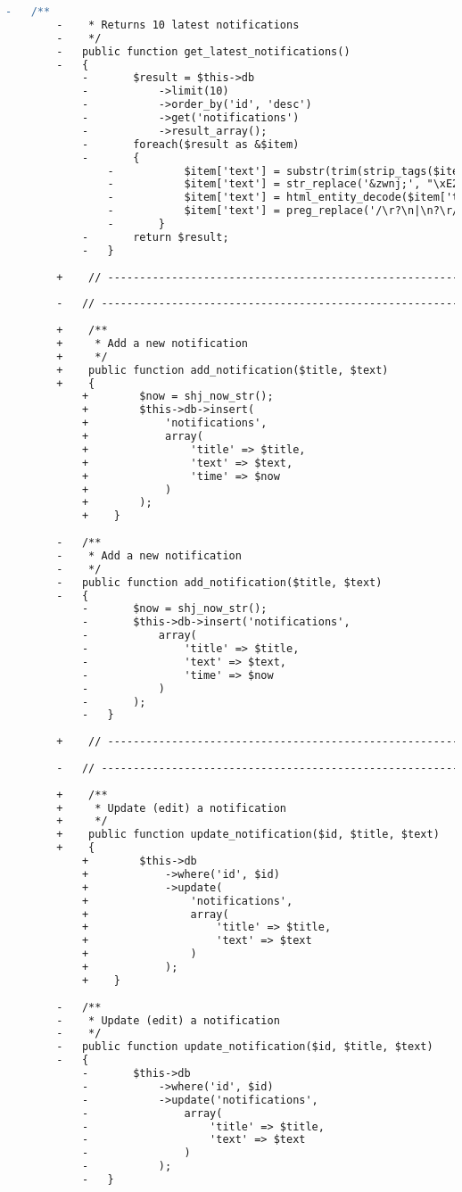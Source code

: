 \begin{lstlisting}[language=diff, caption=Perubahan pada kode Notifications\_model.php]
		-	/**
		-	 * Returns 10 latest notifications
		-	 */
		-	public function get_latest_notifications()
		-	{
			-		$result = $this->db
			-			->limit(10)
			-			->order_by('id', 'desc')
			-			->get('notifications')
			-			->result_array();
			-		foreach($result as &$item)
			-		{
				-			$item['text'] = substr(trim(strip_tags($item['text'])), 0, 300);
				-			$item['text'] = str_replace('&zwnj;', "\xE2\x80\x8c", $item['text']);
				-			$item['text'] = html_entity_decode($item['text']);
				-			$item['text'] = preg_replace('/\r?\n|\n?\r/', ' ', $item['text']);
				-		}
			-		return $result;
			-	}
		
		+    // ------------------------------------------------------------------------
		
		-	// ------------------------------------------------------------------------
		
		+    /**
		+     * Add a new notification
		+     */
		+    public function add_notification($title, $text)
		+    {
			+        $now = shj_now_str();
			+        $this->db->insert(
			+            'notifications',
			+            array(
			+                'title' => $title,
			+                'text' => $text,
			+                'time' => $now
			+            )
			+        );
			+    }
		
		-	/**
		-	 * Add a new notification
		-	 */
		-	public function add_notification($title, $text)
		-	{
			-		$now = shj_now_str();
			-		$this->db->insert('notifications',
			-			array(
			-				'title' => $title,
			-				'text' => $text,
			-				'time' => $now
			-			)
			-		);
			-	}
		
		+    // ------------------------------------------------------------------------
		
		-	// ------------------------------------------------------------------------
		
		+    /**
		+     * Update (edit) a notification
		+     */
		+    public function update_notification($id, $title, $text)
		+    {
			+        $this->db
			+            ->where('id', $id)
			+            ->update(
			+                'notifications',
			+                array(
			+                    'title' => $title,
			+                    'text' => $text
			+                )
			+            );
			+    }
		
		-	/**
		-	 * Update (edit) a notification
		-	 */
		-	public function update_notification($id, $title, $text)
		-	{
			-		$this->db
			-			->where('id', $id)
			-			->update('notifications',
			-				array(
			-					'title' => $title,
			-					'text' => $text
			-				)
			-			);
			-	}
		

\end{lstlisting}
